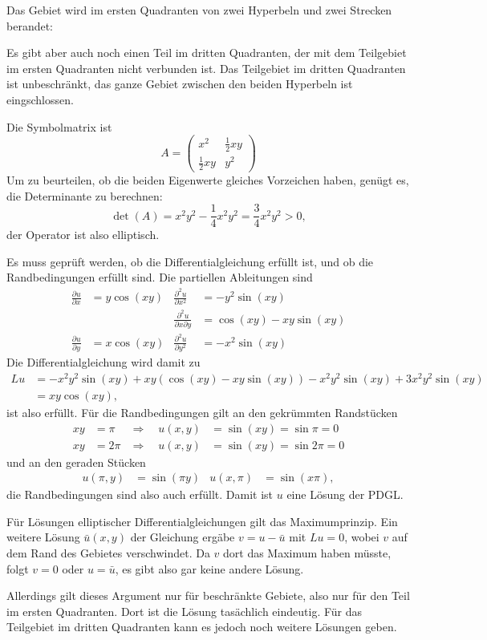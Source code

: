 \begin{loesung}
\begin{teilaufgaben}
\item
Das Gebiet wird im ersten Quadranten von zwei Hyperbeln und zwei Strecken berandet:
\begin{center}
\end{center}
Es gibt aber auch noch einen Teil im dritten Quadranten, der mit dem Teilgebiet
im ersten Quadranten nicht verbunden ist. Das Teilgebiet im
dritten Quadranten ist unbeschränkt, das ganze Gebiet zwischen
den beiden Hyperbeln ist eingschlossen.
\item
Die Symbolmatrix ist
\[
A=\begin{pmatrix}
x^2&\frac12xy\\
\frac12xy&y^2
\end{pmatrix}
\]
Um zu beurteilen, ob die beiden Eigenwerte gleiches Vorzeichen haben,
genügt es, die Determinante zu berechnen:
\[
\det(A)=x^2y^2-\frac14x^2y^2=\frac34x^2y^2>0,
\]
der Operator ist also elliptisch.
\item
Es muss geprüft werden, ob die Differentialgleichung erfüllt ist,
und ob die Randbedingungen erfüllt sind.
Die partiellen Ableitungen sind
\begin{align*}
\frac{\partial u}{\partial x}&=y\cos(xy)
&
\frac{\partial^2 u}{\partial x^2}&=-y^2\sin(xy)
\\
&&\frac{\partial^2 u}{\partial x\partial y}&=\cos(xy)-xy\sin(xy)
\\
\frac{\partial u}{\partial y}&=x\cos(xy)
&
\frac{\partial^2 u}{\partial y^2}&=-x^2\sin(xy)
\end{align*}
Die Differentialgleichung wird damit zu
\begin{align*}
Lu&=-x^2y^2\sin(xy)+xy(\cos(xy)-xy\sin(xy))-x^2y^2\sin(xy)+3x^2y^2\sin(xy)\
\\
&=xy\cos(xy),
\end{align*}
ist also erfüllt.
Für die Randbedingungen gilt an den gekrümmten Randstücken
\begin{align*}
xy&=\pi&\Rightarrow\quad u(x,y)&=\sin(xy)=\sin\pi=0\\
xy&=2\pi&\Rightarrow\quad u(x,y)&=\sin(xy)=\sin2\pi=0
\end{align*}
und an den geraden Stücken
\begin{align*}
u(\pi,y)&=\sin(\pi y)
&u(x,\pi)&=\sin(x\pi),
\end{align*}
die Randbedingungen
sind also auch erfüllt. Damit ist $u$ eine Lösung der PDGL.
\item
Für Lösungen elliptischer Differentialgleichungen gilt das Maximumprinzip.
Ein weitere Lösung $\bar u(x,y)$ der Gleichung ergäbe
$v=u-\bar u$ mit
$Lu=0$, wobei $v$ auf dem Rand des Gebietes verschwindet.
Da $v$ dort das Maximum haben müsste, folgt $v=0$ oder $u=\bar u$,
es gibt also gar keine andere Lösung.

Allerdings gilt dieses Argument nur für beschränkte Gebiete, also nur
für den Teil im ersten Quadranten. Dort ist die Lösung tasächlich
eindeutig. Für das Teilgebiet im dritten Quadranten kann es
jedoch noch weitere Lösungen geben.
\qedhere
\end{teilaufgaben}
\end{loesung}
